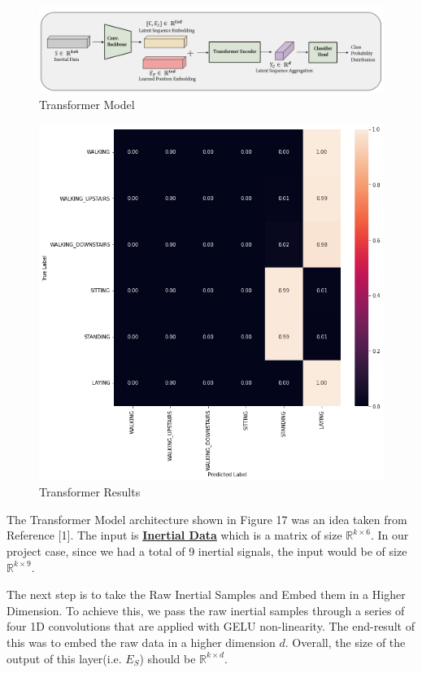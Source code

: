 \documentclass[11pt]{article}
\begin{document}
\begin{figure}[h!]
	\includegraphics[width= 0.9 \linewidth]{imu_model.png}
	\centering
	\caption{Transformer Model}
	\label{imu_model.png}
\end{figure}

\begin{figure}
    \centering
    \includegraphics[width= 0.9 \linewidth]{transformer_results.png}
    \caption{Transformer Results}
    \label{transformer_results.png}
\end{figure}

The Transformer Model architecture shown in Figure 17 was an idea taken from Reference [1]. The input is \underline{\textbf{Inertial Data}} which is a matrix of size $\mathbb{R}^{k \times 6}$. In our project case, since we had a total of 9 inertial signals, the input would be of size $\mathbb{R}^{k \times 9}$. \newline 

The next step is to take the Raw Inertial Samples and Embed them in a Higher Dimension. To achieve this, we pass the raw inertial samples through a series of four 1D convolutions that are applied with GELU non-linearity. The end-result of this was to embed the raw data in a higher dimension $d$. Overall, the size of the output of this layer(i.e. $E_S$) should be $\mathbb{R}^{k \times d}$. \newline 
\end{document}
